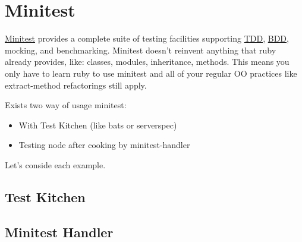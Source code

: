 \section{Minitest}
\label{sec:testing-minitest}

\href{https://github.com/seattlerb/minitest}{Minitest} provides a complete suite of testing facilities supporting \href{http://en.wikipedia.org/wiki/Test-driven\_development}{TDD}, \href{http://en.wikipedia.org/wiki/Behavior-driven\_development}{BDD}, mocking, and benchmarking. Minitest doesn't reinvent anything that ruby already provides, like: classes, modules, inheritance, methods. This means you only have to learn ruby to use minitest and all of your regular OO practices like extract-method refactorings still apply.

Exists two way of usage minitest:

\begin{itemize}
  \item With Test Kitchen (like bats or serverspec)
  \item Testing node after cooking by minitest-handler
\end{itemize}

Let's conside each example.



\subsection{Test Kitchen}



\subsection{Minitest Handler}